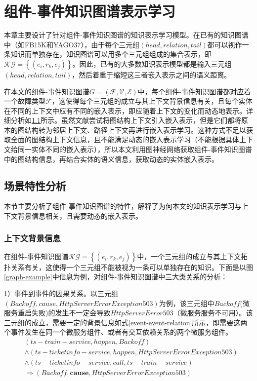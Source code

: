 \chapter{组件-事件知识图谱表示学习}
本章主要设计了针对组件-事件知识图谱的知识表示学习模型。在已有的知识图谱中（如FB15K\cite{bordes2013translatingE}和YAGO37\cite{guo2018knowledge}），由于每个三元组$\left(head, relation, tail\right)$都可以视作一条知识而单独存在，知识图谱可以用多个三元组组成的集合表示，即 $\mathcal{KG}=\left\{\left(e_{i}, r_{k}, e_{j}\right)\right\}$。因此，已有的大多数知识表示模型都是输入三元组$\left(head, relation, tail\right)$，然后着重于缩短这三者嵌入表示之间的语义距离。

在本文的组件-事件知识图谱$G=(\mathcal{F}, \mathcal{V}, \mathcal{E})$中，每个组件-事件知识图谱都对应着一个故障类型$\mathcal{F}$，这使得每个三元组的成立与其上下文背景信息有关，且每个实体在不同的上下文中应有不同的嵌入表示，即应随着上下文的变化而动态地表示。详细分析如\ref{backgroud-analysis}所示。虽然文献\parencite{feng2016gake,shi2017knowledge}尝试将图结构上下文引入嵌入表示，但是它们都将原本的图结构转为邻居上下文、路径上下文再进行嵌入表示学习。这种方式不足以获取全面的图结构上下文信息，且不能满足动态的嵌入表示学习（不能根据具体上下文给同一实体不同的嵌入表示），所以本文利用图神经网络获取组件-事件知识图谱中的图结构信息，再结合实体的语义信息，获取动态的实体嵌入表示。
\section{场景特性分析}\label{backgroud-analysis}
本节主要分析了组件-事件知识图谱的特性，解释了为何本文的知识表示学习与上下文背景信息相关，且需要动态的嵌入表示。

\subsection{上下文背景信息}\label{context-analysis}
在组件-事件知识图谱$\mathcal{KG}=\left\{\left(e_{i}, r_{k}, e_{j}\right)\right\}$中，一个三元组的成立与其上下文拓扑关系有关，这使得一个三元组不能被视为一条可以单独存在的知识。下面是以图\ref{graph-example}中信息为例，对组件-事件知识图谱中三大类关系的分析：

1）事件到事件的因果关系。以三元组$\left(Backoff, cause, HttpServerError Exception 503\right)$为例，该三元组中$Backoff$(微服务重启失败)的发生不一定会导致$HttpServerError 503$（微服务服务不可用）。该三元组的成立，需要一定的背景信息如式\ref{event-event-relation}所示，即需要这两个事件发生在同一个微服务组件、或者有交互依赖关系的两个微服务组件。
\begin{equation}
    \begin{aligned}
        &\left ( ts-train-service, happen, Backoff \right ) \\
        &\wedge \left ( ts-ticketinfo-service, happen, HttpServerError Exception 503 \right ) \\
        &\wedge \left ( ts-ticketinfo-service, call, ts-train-service \right ) \\
        &\Rightarrow \left ( Backoff, \boldsymbol{cause}, HttpServerError Exception 503 \right )
    \end{aligned}
\label{event-event-relation}
\end{equation}

